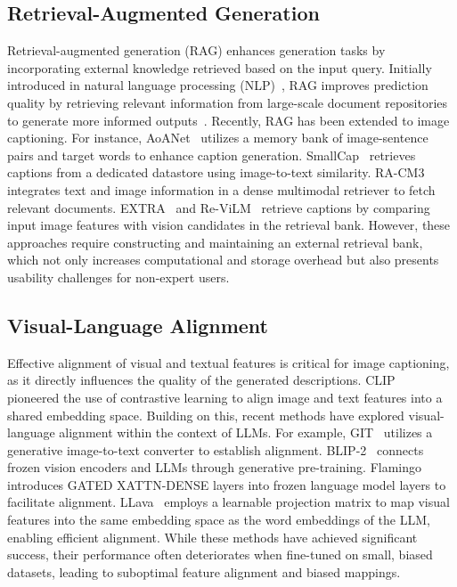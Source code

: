 \subsection{Retrieval-Augmented Generation}
Retrieval-augmented generation (RAG) enhances generation tasks by incorporating external knowledge retrieved based on the input query. Initially introduced in natural language processing (NLP)~\cite{lewis2020retrieval}, RAG improves prediction quality by retrieving relevant information from large-scale document repositories to generate more informed outputs~\cite{singh2021nlp, xu2022rag}. Recently, RAG has been extended to image captioning. For instance, AoANet~\cite{fei2021memory} utilizes a memory bank of image-sentence pairs and target words to enhance caption generation. SmallCap~\cite{ramos2023smallcap} retrieves captions from a dedicated datastore using image-to-text similarity. RA-CM3~\cite{yasunaga2022retrieval} integrates text and image information in a dense multimodal retriever to fetch relevant documents. EXTRA~\cite{ramos2023retrieval} and Re-ViLM~\cite{yang2023re} retrieve captions by comparing input image features with vision candidates in the retrieval bank.
However, these approaches require constructing and maintaining an external retrieval bank, which not only increases computational and storage overhead but also presents usability challenges for non-expert users. 

\subsection{Visual-Language Alignment}
Effective alignment of visual and textual features is critical for image captioning, as it directly influences the quality of the generated descriptions. CLIP~\cite{radford2021learning} pioneered the use of contrastive learning to align image and text features into a shared embedding space. Building on this, recent methods have explored visual-language alignment within the context of LLMs. For example, GIT~\cite{wang2022git} utilizes a generative image-to-text converter to establish alignment. BLIP-2~\cite{li2023blip} connects frozen vision encoders and LLMs through generative pre-training. Flamingo~\cite{alayrac2022flamingo} introduces GATED XATTN-DENSE layers into frozen language model layers to facilitate alignment. LLava~\cite{liu2024visual} employs a learnable projection matrix to map visual features into the same embedding space as the word embeddings of the LLM, enabling efficient alignment.
While these methods have achieved significant success, their performance often deteriorates when fine-tuned on small, biased datasets, leading to suboptimal feature alignment and biased mappings. 

